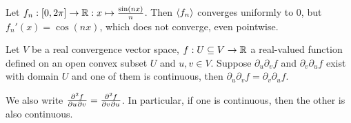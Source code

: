 \begin{example}
Let $f_n: \interval{0,2\pi} \to \R: x\mapsto \frac{\sin(nx)}{n}$. Then $\left\langle f_n \right\rangle$ converges uniformly to $0$, but $f_n'(x) = \cos(nx)$, which does not converge, even pointwise.
\end{example}


\begin{theorem} \label{SchwarzTheorem}
Let $V$ be a real convergence vector space, $f:U\subseteq V\to \mathbb{R}$ a real-valued function defined on an open convex subset $U$ and $u,v\in V$. Suppose $\partial_u\partial_v f$ and $\partial_v\partial_u f$ exist with domain $U$ and one of them is continuous, then $\partial_u\partial_v f = \partial_v\partial_u f$.
\end{theorem}
We also write $\md{f}{2}{u}{}{v}{} = \md{f}{2}{v}{}{u}{}$. In particular, if one is continuous, then the other is also continuous.

